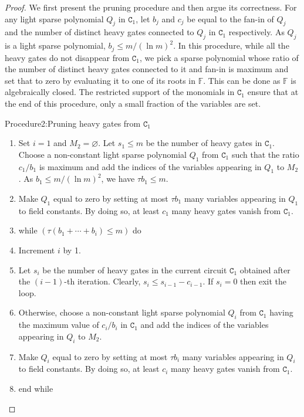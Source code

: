 \begin{proof}
We first present the pruning procedure and then argue its correctness. For any light sparse polynomial $Q_j$ in $\mathtt C_1$, let $b_j$ and $c_j$ be equal to the fan-in of $Q_j$ and the number of distinct heavy gates connected to $Q_j$ in $\mathtt C_1$ respectively. As $Q_j$ is a light sparse polynomial, $b_j\le m/(\ln m)^2$. In this procedure, while all the heavy gates do not disappear from $\mathtt C_1$, we pick a sparse polynomial whose ratio of the number of distinct heavy gates connected to it and fan-in is maximum and set that to zero by evaluating it to one of its roots in $\mathbb F$. This can be done as $\mathbb F$ is algebraically closed. The restricted support of the monomials in $\mathtt C_1$ ensure that at the end of this procedure, only a small fraction of the variables are set.
\begin{authorclaim}{Procedure2:Pruning heavy gates from $\mathtt C_1$}
\begin{enumerate}
\item Set $i=1$ and $M_2=\varnothing$. Let $s_1\le m$ be the number of heavy gates in $\mathtt C_1$. Choose a non-constant light sparse polynomial $Q_1$ from $\mathtt C_1$ such that the ratio $c_1/b_1$ is maximum and add the indices of the variables appearing in $Q_1$ to $M_2$. As $b_1\le m/(\ln m)^2$, we have $\tau b_1\le m$.
\item Make $Q_1$ equal to zero by setting at most $\tau b_1$ many variables appearing in $Q_1$ to field constants. By doing so, at least $c_1$ many heavy gates vanish from $\mathtt C_1$.
\item while $(\tau(b_1+\cdots+b_i)\le m)$ do
\item Increment $i$ by 1.
\item Let $s_i$ be the number of heavy gates in the current circuit $\mathtt C_1$ obtained after the $(i-1)$-th iteration. Clearly, $s_i\le s_{i-1}-c_{i-1}$. If $s_i=0$ then exit the loop.
\item Otherwise, choose a non-constant light sparse polynomial $Q_i$ from $\mathtt C_1$ having the maximum value of $c_i/b_i$ in $\mathtt C_1$ and add the indices of the variables appearing in $Q_i$ to $M_2$.
\item Make $Q_i$ equal to zero by setting at most $\tau b_i$ many variables appearing in $Q_i$ to field constants. By doing so, at least $c_i$ many heavy gates vanish from $\mathtt C_1$.
\item end while
\end{enumerate}
\end{authorclaim}

\end{proof}
